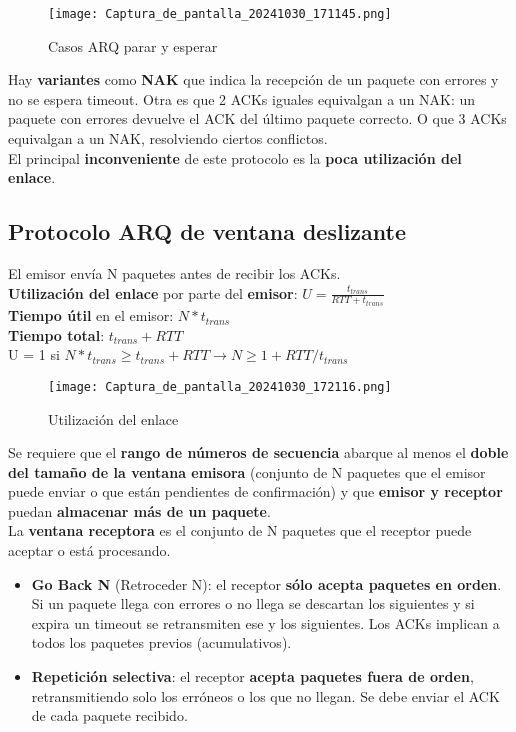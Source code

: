 \documentclass{article}
\begin{document}
\begin{figure}[h]
    \centering
    \texttt{[image: Captura\_de\_pantalla\_20241030\_171145.png]} %
    \caption{Casos ARQ parar y esperar}
    \label{fig:etiqueta}
\end{figure}

Hay \textbf{variantes} como \textbf{NAK} que indica la recepción de un paquete con errores y no se espera timeout.  Otra es que 2 ACKs iguales equivalgan a un NAK: un paquete con errores devuelve el ACK del último paquete correcto. O que 3 ACKs equivalgan a un NAK, resolviendo ciertos conflictos. \\
 
El principal \textbf{inconveniente} de este protocolo es la \textbf{poca utilización del enlace}. \\

\subsection{Protocolo ARQ de ventana deslizante}
El emisor envía N paquetes antes de recibir los ACKs. \\
\textbf{Utilización del enlace} por parte del \textbf{emisor}: $U=\frac{t_{trans}}{RTT+t_{trans}}$ \\
\textbf{Tiempo útil} en el emisor: $N*t_{trans}$ \\
\textbf{Tiempo total}: $t_{trans} + RTT$ \\
U = 1 si $N*t_{trans} \geq t_{trans} + RTT \rightarrow N \geq 1 + RTT/t_{trans}$ \\

\begin{figure}[h]
    \centering
    \texttt{[image: Captura\_de\_pantalla\_20241030\_172116.png]} %
    \caption{Utilización del enlace}
    \label{fig:etiqueta}
\end{figure}

\newpage

Se requiere que el \textbf{rango de números de secuencia} abarque al menos el \textbf{doble del tamaño de la ventana emisora} (conjunto de N paquetes que el emisor puede enviar o que están pendientes de confirmación) y que \textbf{emisor y receptor} puedan \textbf{almacenar más de un paquete}. \\

La \textbf{ventana receptora} es el conjunto de N paquetes que el receptor puede aceptar o está procesando.
\begin{itemize}
    \item \textbf{Go Back N} (Retroceder N): el receptor \textbf{sólo acepta paquetes en orden}. Si un paquete llega con errores o no llega se descartan los siguientes y si expira un timeout se retransmiten ese y los siguientes. Los ACKs implican a todos los paquetes previos (acumulativos).
    
    \item \textbf{Repetición selectiva}: el receptor \textbf{acepta paquetes fuera de orden}, retransmitiendo solo los erróneos o los que no llegan. Se debe enviar el ACK de cada paquete recibido.
\end{itemize}
\end{document}
